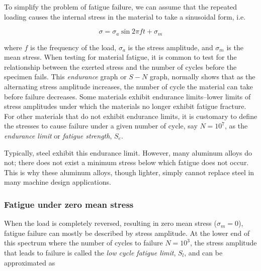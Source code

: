 \documentclass[a4paper,openany,nobib]{tufte-book}
\begin{document}
To simplify the problem of fatigue failure, we can assume that the
repeated loading causes the internal stress in the material to take a
sinusoidal form, i.e.


$$\sigma  = \sigma _a\sin 2\pi ft + \sigma _m$$

where \(f\) is the frequency of the load, \(\sigma_a\) is the stress
amplitude, and \(\sigma_m\) is the mean stress. When testing for material
fatigue, it is common to test for the relationship between the exerted
stress and the number of cycles before the specimen fails. This
\emph{endurance} graph or \(S-N\) graph, normally shows that as the alternating
stress amplitude increases, the number of cycle the material can take
before failure decreases. Some materials exhibit endurance limits--lower
limits of stress amplitudes under which the materials no longer exhibit
fatigue fracture. For other materials that do not exhibit endurance
limits, it is customary to define the stresses to cause failure under a
given number of cycle, say \(N = 10^7\), as the \emph{endurance limit} or
\emph{fatigue strength}, \(S_e\).


Typically, steel exhibit this endurance limit. However, many aluminum
alloys do not; there does not exist a minimum stress below which fatigue
does not occur. This is why these aluminum alloys, though lighter,
simply cannot replace steel in many machine design applications.

\subsubsection{Fatigue under zero mean stress}
\label{fatigue-under-zero-mean-stress}
When the load is completely reversed, resulting in zero mean stress
(\(\sigma_m = 0\)), fatigue failure can mostly be described by stress
amplitude. At the lower end of this spectrum where the number of cycles
to failure \(N = 10^3\), the stress amplitude that leads to failure is
called the \emph{low cycle fatigue limit}, \(S_l\), and can be approximated as
\end{document}
